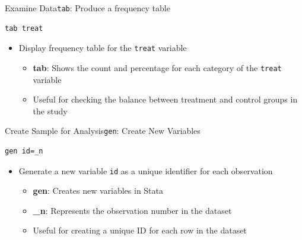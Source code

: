 \documentclass[dvipsnames,hyperref={pdfpagelabels=false}]{beamer}
\begin{document}
\begin{frame}[fragile]{Examine Data}{\texttt{tab}: Produce a frequency table}
\begin{lstlisting}
tab treat
\end{lstlisting}
	\begin{itemize}
		\vspace{0.2cm}
		\item Display frequency table for the \texttt{treat} variable
		\vspace{0.2cm}
		\begin{itemize}
			\item \textbf{tab}: Shows the count and percentage for each category of the \texttt{treat} variable
			\vspace{0.2cm}
			\item Useful for checking the balance between treatment and control groups in the study
		\end{itemize}
	\end{itemize}
	\end{frame}


\begin{frame}[fragile]{Create Sample for Analysis}{\texttt{gen}: Create New Variables}
\begin{lstlisting}
gen id=_n
\end{lstlisting}
\begin{itemize}
	\vspace{0.2cm}
	\item Generate a new variable \texttt{id} as a unique identifier for each observation
	\vspace{0.2cm}
	\begin{itemize}
		\item \textbf{gen}: Creates new variables in Stata
		\vspace{0.2cm}
		\item \textbf{\_n}: Represents the observation number in the dataset
		\vspace{0.2cm}
		\item Useful for creating a unique ID for each row in the dataset
	\end{itemize}
\end{itemize}
\end{frame}
\end{document}
